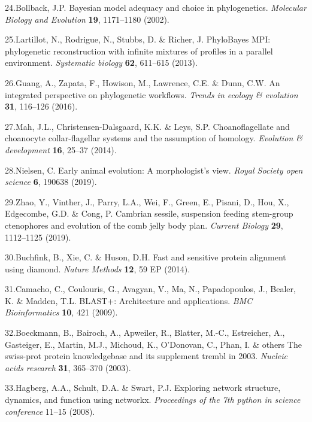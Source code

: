 \documentclass[]{article}
\begin{document}
\leavevmode\hypertarget{ref-Bollback:2002to}{}%
24.Bollback, J.P. Bayesian model adequacy and choice in phylogenetics.
\emph{Molecular Biology and Evolution} \textbf{19}, 1171--1180 (2002).

\leavevmode\hypertarget{ref-Lartillot:2013fg}{}%
25.Lartillot, N., Rodrigue, N., Stubbs, D. \& Richer, J. PhyloBayes MPI:
phylogenetic reconstruction with infinite mixtures of profiles in a
parallel environment. \emph{Systematic biology} \textbf{62}, 611--615
(2013).

\leavevmode\hypertarget{ref-guang2016integrated}{}%
26.Guang, A., Zapata, F., Howison, M., Lawrence, C.E. \& Dunn, C.W. An
integrated perspective on phylogenetic workflows. \emph{Trends in
ecology \& evolution} \textbf{31}, 116--126 (2016).

\leavevmode\hypertarget{ref-mah2014choanoflagellate}{}%
27.Mah, J.L., Christensen-Dalsgaard, K.K. \& Leys, S.P. Choanoflagellate
and choanocyte collar-flagellar systems and the assumption of homology.
\emph{Evolution \& development} \textbf{16}, 25--37 (2014).

\leavevmode\hypertarget{ref-nielsen2019early}{}%
28.Nielsen, C. Early animal evolution: A morphologist's view.
\emph{Royal Society open science} \textbf{6}, 190638 (2019).

\leavevmode\hypertarget{ref-zhao2019cambrian}{}%
29.Zhao, Y., Vinther, J., Parry, L.A., Wei, F., Green, E., Pisani, D.,
Hou, X., Edgecombe, G.D. \& Cong, P. Cambrian sessile, suspension
feeding stem-group ctenophores and evolution of the comb jelly body
plan. \emph{Current Biology} \textbf{29}, 1112--1125 (2019).

\leavevmode\hypertarget{ref-Buchfink:2014}{}%
30.Buchfink, B., Xie, C. \& Huson, D.H. Fast and sensitive protein
alignment using diamond. \emph{Nature Methods} \textbf{12}, 59 EP
(2014).

\leavevmode\hypertarget{ref-Camacho:2009}{}%
31.Camacho, C., Coulouris, G., Avagyan, V., Ma, N., Papadopoulos, J.,
Bealer, K. \& Madden, T.L. BLAST+: Architecture and applications.
\emph{BMC Bioinformatics} \textbf{10}, 421 (2009).

\leavevmode\hypertarget{ref-boeckmann:2003swiss}{}%
32.Boeckmann, B., Bairoch, A., Apweiler, R., Blatter, M.-C., Estreicher,
A., Gasteiger, E., Martin, M.J., Michoud, K., O'Donovan, C., Phan, I. \&
others The swiss-prot protein knowledgebase and its supplement trembl in
2003. \emph{Nucleic acids research} \textbf{31}, 365--370 (2003).

\leavevmode\hypertarget{ref-Hagberg:2008}{}%
33.Hagberg, A.A., Schult, D.A. \& Swart, P.J. Exploring network
structure, dynamics, and function using networkx. \emph{Proceedings of
the 7th python in science conference} 11--15 (2008).
\end{document}
